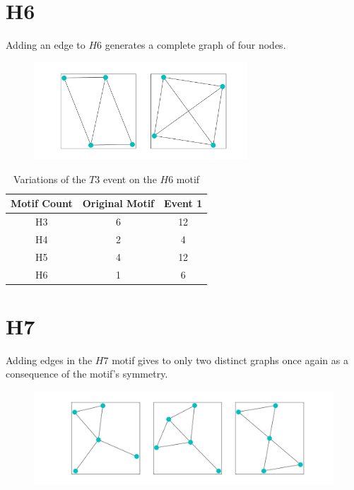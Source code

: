 \section{H6}
Adding an edge to $H6$ generates a complete graph of four nodes. 

\begin{figure}[!ht]
    \includegraphics[width=8cm]{Images/H6_T3_evolution.png}
    \centering
\end{figure}

\begin{table}
    \centering
    \begin{tabular}{||c c c ||} 
    \hline
    Motif Count & Original Motif & Event 1  \\ [0.5ex] 
    \hline\hline
    H3 & 6 & 12 \\ 
    \hline
    H4 & 2 & 4 \\
    \hline
    H5 & 4 & 12 \\
    \hline
    H6 & 1 & 6 \\
    \hline
    \hline
   \end{tabular}
   \caption{Variations of the $T3$ event on the $H6$ motif}
   \label{table:15}
\end{table}

\section{H7}
Adding edges in the $H7$ motif gives to only two distinct graphs once again as 
a consequence of the motif's symmetry. 
 
\begin{figure}[!ht]
    \includegraphics[width=12cm]{Images/H7_T3_evolution.png}
    \centering
\end{figure}

